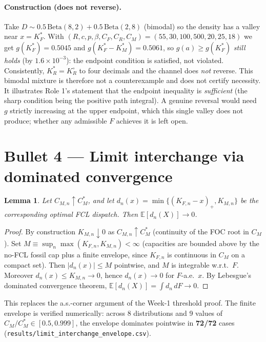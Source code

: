 \documentclass[11pt]{article}
\newtheorem{lemma}{Lemma}
\theoremstyle{remark}
\begin{document}
\paragraph{Construction (does not reverse).} Take
$D\sim 0.5\,\mathrm{Beta}(8,2)+0.5\,\mathrm{Beta}(2,8)$ (bimodal) so the
density has a valley near $x=K_F^*$. With $(R,c,p,\beta,C_F,C_R,C_M)
=(55,30,100,500,20,25,18)$ we get $g(K_F^*)=0.5045$ and
$g(K_F^*-K_M^*)=0.5061$, so $g(a)\ge g(K_F^*)$ \emph{still holds} (by
$1.6\!\times\!10^{-3}$): the endpoint condition is satisfied, not violated.
Consistently, $K_R^*=K_R^\circ$ to four decimals and the channel does
\emph{not} reverse. This bimodal mixture is therefore not a counterexample
and does not certify necessity. It illustrates Role 1's statement that the
endpoint inequality is \emph{sufficient} (the sharp condition being the
positive path integral). A genuine reversal would need $g$ strictly
increasing at the upper endpoint, which this single valley does not
produce; whether any admissible $F$ achieves it is left open.

\section{Bullet 4 --- Limit interchange via dominated convergence}
\begin{lemma}
Let $C_{M,n}\uparrow C_M^{\!*}$, and let
$d_n(x)=\min\{(K_{F,n}-x)_+,K_{M,n}\}$ be the corresponding optimal FCL
dispatch. Then $\mathbb E[d_n(X)]\to 0$.
\end{lemma}
\begin{proof}
By construction $K_{M,n}\downarrow 0$ as $C_{M,n}\uparrow C_M^{\!*}$
(continuity of the FOC root in $C_M$). Set
$M\equiv \sup_n\max(K_{F,n},K_{M,n})<\infty$ (capacities are bounded above
by the no-FCL fossil cap plus a finite envelope, since $K_{F,n}$ is
continuous in $C_M$ on a compact set). Then
$|d_n(x)|\le M$ pointwise, and $M$ is integrable w.r.t.\ $F$. Moreover
$d_n(x)\le K_{M,n}\to 0$, hence $d_n(x)\to 0$ for $F$-a.e.\ $x$.
By Lebesgue's dominated convergence theorem,
$\mathbb E[d_n(X)]=\int d_n\,dF\to 0$.
\end{proof}
This replaces the a.s.-corner argument of the Week-1 threshold proof.
The finite envelope is verified numerically: across 8 distributions and 9
values of $C_M/C_M^{\!*}\in[0.5,0.999]$, the envelope dominates pointwise
in \textbf{72/72} cases (\texttt{results/limit\_interchange\_envelope.csv}).
\end{document}
